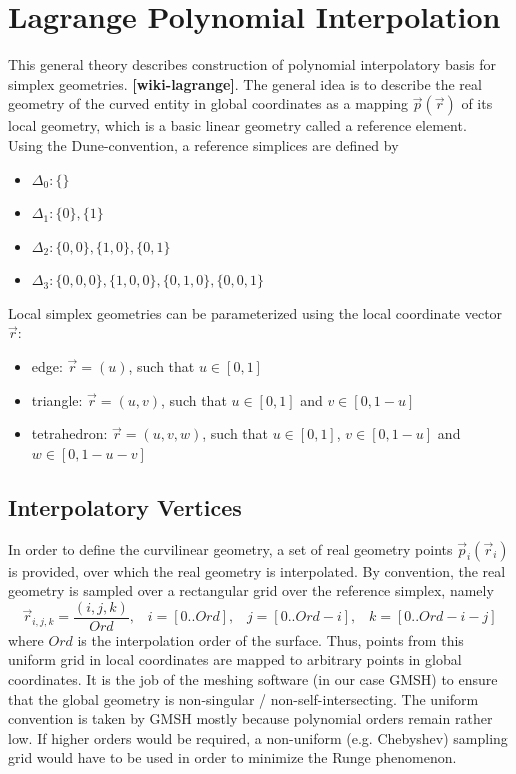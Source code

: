 \section{Lagrange Polynomial Interpolation}
\label{theory-lagrange}

This general theory describes construction of polynomial interpolatory basis for simplex geometries. \textbf{[wiki-lagrange]}. The general idea is to describe the real geometry of the curved entity in global coordinates as a mapping $\vec{p}(\vec{r})$ of its local geometry, which is a basic linear geometry called a reference element. \\

\noindent
Using the Dune-convention, a reference simplices are defined by
\begin{itemize}
	\item $\Delta_0 : \{ \}$
	\item $\Delta_1 : \{ 0\}, \{ 1\}$
	\item $\Delta_2 : \{ 0, 0 \}, \{ 1, 0 \}, \{ 0, 1 \}$
	\item $\Delta_3 : \{ 0, 0, 0 \}, \{ 1, 0, 0 \}, \{ 0, 1, 0 \}, \{ 0, 0, 1 \}$
\end{itemize}

\noindent
Local simplex geometries can be parameterized using the local coordinate vector $\vec{r}$:
\begin{itemize}
	\item edge:			$\vec{r}=(u)$,		such that $u \in [0,1]$
	\item triangle: 	$\vec{r}=(u,v)$,	such that $u \in [0,1]$ and $v \in [0, 1-u]$
	\item tetrahedron:	$\vec{r}=(u,v,w)$,	such that $u \in [0,1]$, $v \in [0, 1-u]$ and $w \in [0, 1-u-v]$ 
\end{itemize}

\subsection{Interpolatory Vertices}
\label{theory-lagrange-vertices}

\noindent
In order to define the curvilinear geometry, a set of real geometry points $\vec{p}_i(\vec{r}_i)$ is provided, over which the real geometry is interpolated. By convention, the real geometry is sampled over a rectangular grid over the reference simplex, namely
\[\vec{r}_{i,j,k} = \frac{(i,j,k)}{Ord}, \;\;\; i=[0..Ord], \;\;\; j=[0..Ord-i], \;\;\; k=[0..Ord-i-j]\]
where $Ord$ is the interpolation order of the surface. Thus, points from this uniform grid in local coordinates are mapped to arbitrary points in global coordinates. It is the job of the meshing software (in our case GMSH) to ensure that the global geometry is non-singular / non-self-intersecting. The uniform convention is taken by GMSH mostly because polynomial orders remain rather low. If higher orders would be required, a non-uniform (e.g. Chebyshev) sampling grid would have to be used in order to minimize the Runge phenomenon. \\

